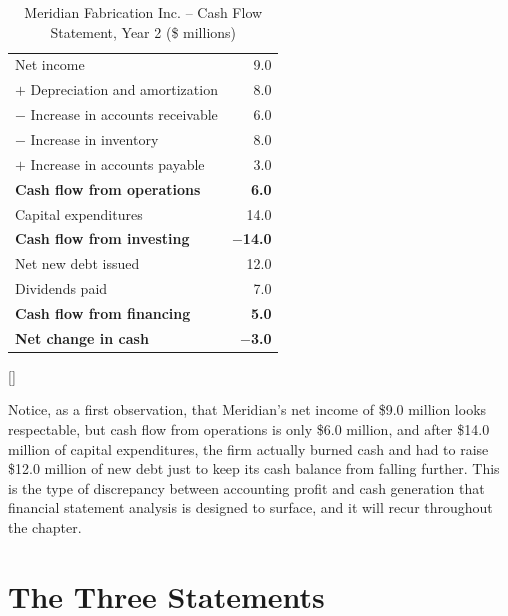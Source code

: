 \documentclass[../ai_in_finance]{subfiles}
\begin{document}
\begin{table}[htbp]
\centering
\begin{lrbox}{\bookmeasuredbox}
\begin{tabular}{lr}
\toprule
Net income                                & 9.0 \\
$+$ Depreciation and amortization         & 8.0 \\
$-$ Increase in accounts receivable       & 6.0 \\
$-$ Increase in inventory                 & 8.0 \\
$+$ Increase in accounts payable          & 3.0 \\
\textbf{Cash flow from operations}        & \textbf{6.0} \\
Capital expenditures                      & 14.0 \\
\textbf{Cash flow from investing}         & \textbf{$-$14.0} \\
Net new debt issued                       & 12.0 \\
Dividends paid                            & 7.0 \\
\textbf{Cash flow from financing}         & \textbf{5.0} \\
\textbf{Net change in cash}               & \textbf{$-$3.0} \\
\bottomrule
\end{tabular}
\end{lrbox}
\ifdim\wd\bookmeasuredbox<0.65\linewidth
\setlength{\bookcapwidth}{0.65\linewidth}
\else
\setlength{\bookcapwidth}{\wd\bookmeasuredbox}
\fi
{}[\bookcapwidth]{
\usebox{\bookmeasuredbox}
}{
\caption{Meridian Fabrication Inc. -- Cash Flow Statement, Year 2 (\$ millions)}
\label{tab:meridian_cf}
}
\end{table}

Notice, as a first observation, that Meridian's net income of \$9.0 million looks respectable, but cash flow from operations is only \$6.0 million, and after \$14.0 million of capital expenditures, the firm actually burned cash and had to raise \$12.0 million of new debt just to keep its cash balance from falling further. This is the type of discrepancy between accounting profit and cash generation that financial statement analysis is designed to surface, and it will recur throughout the chapter.

\section{The Three Statements}
\end{document}

